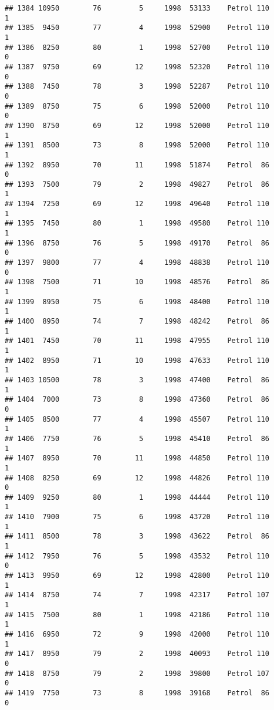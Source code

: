 \documentclass[]{article}
\begin{document}
\begin{verbatim}
## 1384 10950        76         5     1998  53133    Petrol 110         1
## 1385  9450        77         4     1998  52900    Petrol 110         1
## 1386  8250        80         1     1998  52700    Petrol 110         0
## 1387  9750        69        12     1998  52320    Petrol 110         0
## 1388  7450        78         3     1998  52287    Petrol 110         0
## 1389  8750        75         6     1998  52000    Petrol 110         0
## 1390  8750        69        12     1998  52000    Petrol 110         1
## 1391  8500        73         8     1998  52000    Petrol 110         1
## 1392  8950        70        11     1998  51874    Petrol  86         0
## 1393  7500        79         2     1998  49827    Petrol  86         1
## 1394  7250        69        12     1998  49640    Petrol 110         1
## 1395  7450        80         1     1998  49580    Petrol 110         1
## 1396  8750        76         5     1998  49170    Petrol  86         0
## 1397  9800        77         4     1998  48838    Petrol 110         0
## 1398  7500        71        10     1998  48576    Petrol  86         1
## 1399  8950        75         6     1998  48400    Petrol 110         1
## 1400  8950        74         7     1998  48242    Petrol  86         1
## 1401  7450        70        11     1998  47955    Petrol 110         1
## 1402  8950        71        10     1998  47633    Petrol 110         1
## 1403 10500        78         3     1998  47400    Petrol  86         1
## 1404  7000        73         8     1998  47360    Petrol  86         0
## 1405  8500        77         4     1998  45507    Petrol 110         1
## 1406  7750        76         5     1998  45410    Petrol  86         1
## 1407  8950        70        11     1998  44850    Petrol 110         1
## 1408  8250        69        12     1998  44826    Petrol 110         0
## 1409  9250        80         1     1998  44444    Petrol 110         1
## 1410  7900        75         6     1998  43720    Petrol 110         1
## 1411  8500        78         3     1998  43622    Petrol  86         1
## 1412  7950        76         5     1998  43532    Petrol 110         0
## 1413  9950        69        12     1998  42800    Petrol 110         1
## 1414  8750        74         7     1998  42317    Petrol 107         1
## 1415  7500        80         1     1998  42186    Petrol 110         1
## 1416  6950        72         9     1998  42000    Petrol 110         1
## 1417  8950        79         2     1998  40093    Petrol 110         0
## 1418  8750        79         2     1998  39800    Petrol 107         0
## 1419  7750        73         8     1998  39168    Petrol  86         0

\end{verbatim}
\end{document}
